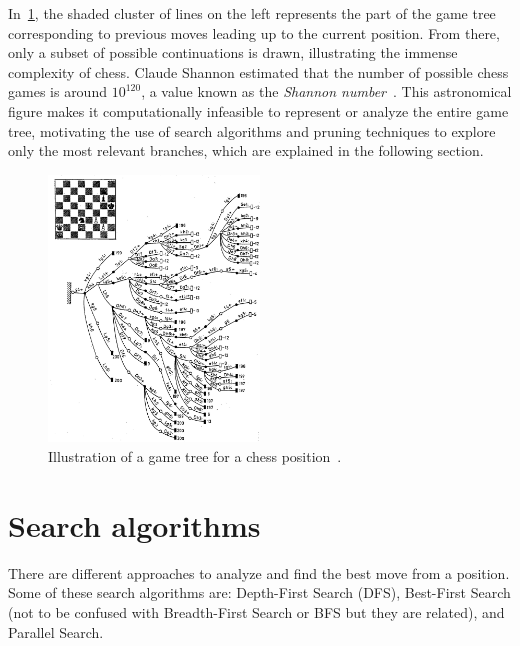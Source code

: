 \vspace{1em}

\noindent In~\cref{fig:game-tree}, the shaded cluster of lines on the left represents the part of the game tree corresponding to previous moves leading up to the current position. From there, only a subset of possible continuations is drawn, illustrating the immense complexity of chess. Claude Shannon estimated that the number of possible chess games is around $10^{120}$, a value known as the \textit{Shannon number}~\cite{Shannon1950}. This astronomical figure makes it computationally infeasible to represent or analyze the entire game tree, motivating the use of search algorithms and pruning techniques to explore only the most relevant branches, which are explained in the following section.

\begin{figure}[t]
    \centering
    \includegraphics[width=0.5\textwidth]{Imagenes/chess-game-tree.jpg}
    \caption{Illustration of a game tree for a chess position~\cite{BotvinnikLongRangePlanning}.}\label{fig:game-tree}
\end{figure}

\section{Search algorithms}

There are different approaches to analyze and find the best move from a position. Some of these search algorithms are: Depth-First Search (DFS), Best-First Search (not to be confused with Breadth-First Search or BFS but they are related), and Parallel Search.

\vspace{1em}

